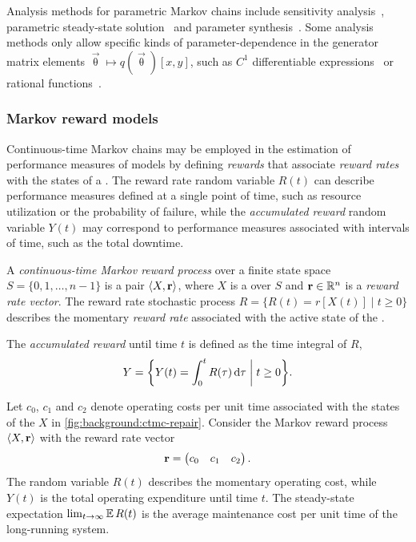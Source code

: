 Analysis methods for parametric Markov chains include sensitivity analysis~\citep{Blake88sensitivity}, parametric steady-state solution~\citep{Hahn11parametric,Voros17pdn} and parameter synthesis~\citep{Quatmann16mdp}. Some analysis methods only allow specific kinds of parameter-dependence in the generator matrix elements \(\vec{\uptheta} \mapsto q(\vec{\uptheta})[x, y]\), such as \(C^1\) differentiable expressions~\citep{Blake88sensitivity} or rational functions~\citep{Hahn11parametric}.

\subsubsection{Markov reward models}

Continuous-time Markov chains may be employed in the estimation of performance measures of models by defining \emph{rewards} that associate \emph{reward rates} with the states of a . The reward rate random variable $R(t)$ can describe performance measures defined at a single point of time, such as resource utilization or the probability of failure, while the \emph{accumulated reward} random variable $Y(t)$ may correspond to performance measures associated with intervals of time, such as the total downtime.

\begin{dfn}
  A \emph{continuous-time Markov reward process} over a finite state space \(S = \{0, 1, \ldots, n - 1\}\) is a pair \(\ltup X, \vec{r} \rtup\), where \(X\) is a  over \(S\) and \(\vec{r} \in \RR^n\) is a \emph{reward rate vector}. The reward rate stochastic process \(R = \{ R(t) = r[X(t)] \mid t \ge 0 \}\) describes the momentary \emph{reward rate} associated with the active state of the .

  The \emph{accumulated reward} until time \(t\) is defined as the time integral of \(R\),
  \begin{equation}
    Y = \biggl\{ Y(t) = \int_{0}^t R(\tau) \,\dd \tau \biggm\vert t \ge 0 \biggr\}\text.
  \end{equation}
\end{dfn}

\begin{example}
  Let \(c_0\), \(c_1\) and \(c_2\) denote operating costs per unit time associated with the states of the  \(X\) in \vref{fig:background:ctmc-repair}. Consider the Markov reward process \(\ltup X, \vec{r} \rtup\) with the reward rate vector
  \begin{equation}
    \vec{r} = \begin{pmatrix} c_0 & c_1 & c_2 \end{pmatrix} \text.
  \end{equation}
  The random variable \(R(t)\) describes the momentary operating cost, while \(Y(t)\) is the total operating expenditure until time \(t\). The steady-state expectation \(\lim_{t \to \infty} \Ex R(t)\) is the average maintenance cost per unit time of the long-running system.
\end{example}

